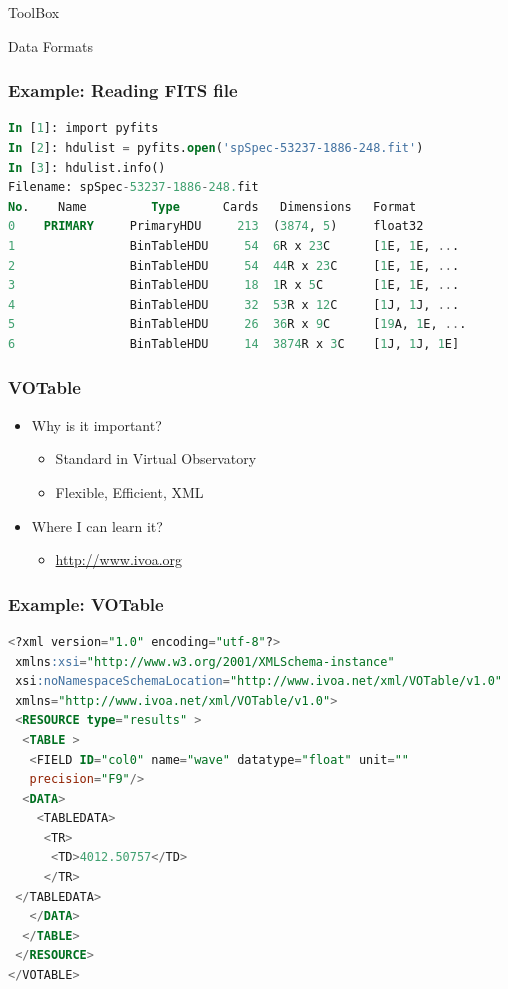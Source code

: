 \documentclass[fleqn]{beamer}
\begin{document}
\begin{section}{ToolBox}
\begin{section}{Data Formats}
\begin{frame}[containsverbatim]\frametitle{Example: Reading FITS file}
\begin{lstlisting}[language=SQL]
In [1]: import pyfits
In [2]: hdulist = pyfits.open('spSpec-53237-1886-248.fit')
In [3]: hdulist.info()
Filename: spSpec-53237-1886-248.fit
No.    Name         Type      Cards   Dimensions   Format
0    PRIMARY     PrimaryHDU     213  (3874, 5)     float32
1                BinTableHDU     54  6R x 23C      [1E, 1E, ...
2                BinTableHDU     54  44R x 23C     [1E, 1E, ...
3                BinTableHDU     18  1R x 5C       [1E, 1E, ...
4                BinTableHDU     32  53R x 12C     [1J, 1J, ...
5                BinTableHDU     26  36R x 9C      [19A, 1E, ...
6                BinTableHDU     14  3874R x 3C    [1J, 1J, 1E]
\end{lstlisting}
\end{frame}




  \begin{frame}\frametitle{VOTable}
  \begin{itemize}
    \item{Why is it important?}
      \begin{itemize}
      \item Standard in Virtual Observatory
      \item Flexible, Efficient, XML
      \end{itemize}
    \item{Where I can learn it?}
      \begin{itemize}
      \item \url{http://www.ivoa.org}
      \end{itemize}
  \end{itemize}
  \end{frame}

\begin{frame}[containsverbatim]\frametitle{Example: VOTable}
\begin{lstlisting}[language=SQL]
<?xml version="1.0" encoding="utf-8"?>
 xmlns:xsi="http://www.w3.org/2001/XMLSchema-instance"
 xsi:noNamespaceSchemaLocation="http://www.ivoa.net/xml/VOTable/v1.0"
 xmlns="http://www.ivoa.net/xml/VOTable/v1.0">
 <RESOURCE type="results" >
  <TABLE >
   <FIELD ID="col0" name="wave" datatype="float" unit=""
   precision="F9"/>
  <DATA>
    <TABLEDATA>
     <TR>
      <TD>4012.50757</TD>
     </TR>
 </TABLEDATA>
   </DATA>
  </TABLE>
 </RESOURCE>
</VOTABLE>
\end{lstlisting}
\end{frame}






\end{section}
\end{section}
\end{document}
